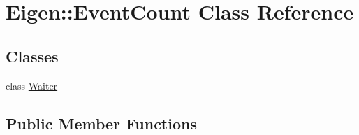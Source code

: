 \hypertarget{class_eigen_1_1_event_count}{}\section{Eigen\+:\+:Event\+Count Class Reference}
\label{class_eigen_1_1_event_count}
\subsection*{Classes}
\begin{DoxyCompactItemize}
\item 
class \hyperlink{class_eigen_1_1_event_count_1_1_waiter}{Waiter}
\end{DoxyCompactItemize}
\subsection*{Public Member Functions}
